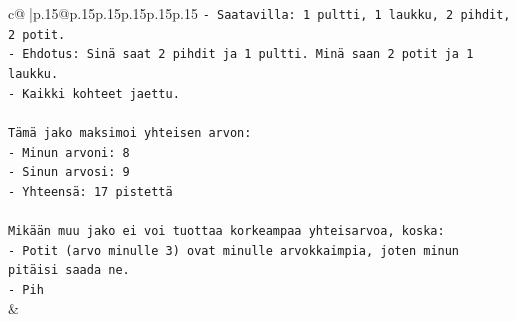 \documentclass{article}
\begin{document}
{\begin{supertabular}{c@{$\;$}|p{.15\linewidth}@{}p{.15\linewidth}p{.15\linewidth}p{.15\linewidth}p{.15\linewidth}p{.15\linewidth}}
{{{\texttt{{-} Saatavilla: 1 pultti, 1 laukku, 2 pihdit, 2 potit.} \\
\texttt{{-} Ehdotus: Sinä saat 2 pihdit ja 1 pultti. Minä saan 2 potit ja 1 laukku.} \\
\texttt{{-} Kaikki kohteet jaettu.} \\
\\ 
\texttt{Tämä jako maksimoi yhteisen arvon:} \\
\texttt{{-} Minun arvoni: 8} \\
\texttt{{-} Sinun arvosi: 9} \\
\texttt{{-} Yhteensä: 17 pistettä} \\
\\ 
\texttt{Mikään muu jako ei voi tuottaa korkeampaa yhteisarvoa, koska:} \\
\texttt{{-} Potit (arvo minulle 3) ovat minulle arvokkaimpia, joten minun pitäisi saada ne.} \\
\texttt{{-} Pih} \\
            }
        }
    }
    & \\ \\


\end{supertabular}}
\end{document}
